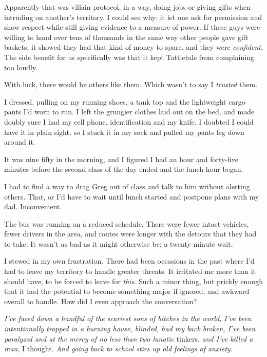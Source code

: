 Apparently that was villain protocol, in a way, doing jobs or giving gifts when intruding on another's territory.  I could see why: it let one ask for permission and show respect while still giving evidence to a measure of power.  If these guys were willing to hand over tens of thousands in the same way other people gave gift baskets, it showed they had that kind of money to spare, and they were \emph{confident}.  The side benefit for us specifically was that it kept Tattletale from complaining too loudly.



With luck, there would be others like them.  Which wasn't to say I \emph{trusted }them.



I dressed, pulling on my running shoes, a tank top and the lightweight cargo pants I'd worn to run.  I left the grungier clothes laid out on the bed, and made doubly sure I had my cell phone, identification and my knife.  I doubted I could have it in plain sight, so I stuck it in my sock and pulled my pants leg down around it.



It was nine fifty in the morning, and I figured I had an hour and forty-five minutes before the second class of the day ended and the lunch hour began.



I had to find a way to drag Greg out of class and talk to him without alerting others.  That, or I'd have to wait until lunch started and postpone plans with my dad.  Inconvenient.



The bus was running on a reduced schedule.  There were fewer intact vehicles, fewer drivers in the area, and routes were longer with the detours that they had to take.  It wasn't as bad as it might otherwise be: a twenty-minute wait.



I stewed in my own frustration.  There had been occasions in the past where I'd had to leave my territory to handle greater threats.  It irritated me more than it should have, to be forced to leave for \emph{this}.  Such a minor thing, but prickly enough that it had the potential to become something major if ignored, and awkward overall to handle.  How did I even approach the conversation?



\emph{I've faced down a handful of the scariest sons of bitches in the world, I've been intentionally trapped in a burning house, blinded, had my back broken, I've been paralyzed and at the mercy of no less than two lunatic} tinkers,\emph{ and I've killed a man}, I thought.  \emph{And going back to school stirs up old feelings of anxiety}.



